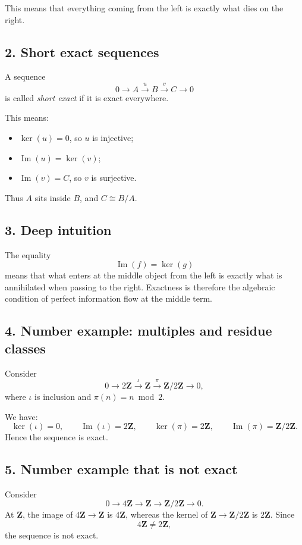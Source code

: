 \documentclass[12pt,a4paper]{article}
\theoremstyle{plain}
\theoremstyle{definition}      %
\begin{document}
	This means that everything coming from the left is exactly what dies on the right.
	
	\subsection*{2. Short exact sequences}
	
	A sequence
	\[
	0\to A\xrightarrow{u} B\xrightarrow{v} C\to 0
	\]
	is called \emph{short exact} if it is exact everywhere.
	
	This means:
	\begin{itemize}
		\item \(\ker(u)=0\), so \(u\) is injective;
		\item \(\operatorname{Im}(u)=\ker(v)\);
		\item \(\operatorname{Im}(v)=C\), so \(v\) is surjective.
	\end{itemize}
	
	Thus \(A\) sits inside \(B\), and \(C\cong B/A\).
	
	\subsection*{3. Deep intuition}
	
	The equality
	\[
	\operatorname{Im}(f)=\ker(g)
	\]
	means that what enters at the middle object from the left is exactly what is annihilated when passing to the right. Exactness is therefore the algebraic condition of perfect information flow at the middle term.
	
	\subsection*{4. Number example: multiples and residue classes}
	
	Consider
	\[
	0\to 2\mathbf Z \xrightarrow{\iota} \mathbf Z \xrightarrow{\pi} \mathbf Z/2\mathbf Z \to 0,
	\]
	where \(\iota\) is inclusion and \(\pi(n)=n\bmod 2\).
	
	We have:
	\[
	\ker(\iota)=0,
	\qquad
	\operatorname{Im}(\iota)=2\mathbf Z,
	\qquad
	\ker(\pi)=2\mathbf Z,
	\qquad
	\operatorname{Im}(\pi)=\mathbf Z/2\mathbf Z.
	\]
	Hence the sequence is exact.
	
	\subsection*{5. Number example that is not exact}
	
	Consider
	\[
	0\to 4\mathbf Z \to \mathbf Z \to \mathbf Z/2\mathbf Z \to 0.
	\]
	At \(\mathbf Z\), the image of \(4\mathbf Z\to \mathbf Z\) is \(4\mathbf Z\), whereas the kernel of \(\mathbf Z\to \mathbf Z/2\mathbf Z\) is \(2\mathbf Z\). Since
	\[
	4\mathbf Z\neq 2\mathbf Z,
	\]
	the sequence is not exact.
	
\end{document}
